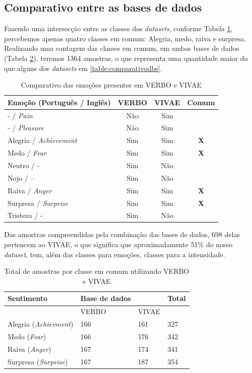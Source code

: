 \subsection{Comparativo entre as bases de dados}

Fazendo uma intersecção entre as classes dos \textit{datasets}, conforme Tabela \ref{table:verbovsvivae}, percebemos apenas quatro classes em comum: Alegria, medo, raiva e surpresa. Realizando uma contagem das classes em comum, em ambas bases de dados (Tabela \ref{table:totalporclasse}), teremos 1364 amostras, o que representa uma quantidade maior do que alguns dos \textit{datasets} em \ref{table:comparativodbs}.

\begin{table}[]
\centering
\caption{Comparativo das emoções presentes em VERBO e VIVAE}
    \begin{tabular}{|l|c|c|c|}
    \hline
        Emoção (Português / Inglês) & VERBO & VIVAE & Comum  \\ \hline
        - / \textit{Pain} & Não & Sim &    \\ \hline
        - / \textit{Pleasure} & Não & Sim &    \\ \hline
        Alegria / \textit{Achievement} & Sim & Sim & \textbf{X}  \\ \hline
        Medo / \textit{Fear} & Sim & Sim & \textbf{X}  \\ \hline
        Neutro / - & Sim & Não &    \\ \hline
        Nojo / – & Sim & Não &    \\ \hline
        Raiva / \textit{Anger} & Sim & Sim & \textbf{X}  \\ \hline
        Surpresa / \textit{Surprise} & Sim & Sim & \textbf{X}  \\ \hline
        Tristeza / - & Sim & Não &    \\ \hline
    \end{tabular}\label{table:verbovsvivae}
\end{table}

Das amostras compreendidas pela combinação das bases de dados, 698 delas pertencem ao \acrshort{VIVAE}, o que significa que aproximadamente 51\% do nosso \textit{dataset}, tem, além das classes para emoções, classes para a intensidade.

\begin{table}[]
    \centering
    \caption{Total de amostras por classe em comum utilizando VERBO e VIVAE}
    \begin{tabular}{|l|l|l|l|}
    \hline
        Sentimento & Base de dados & ~ & Total \\ \hline
        ~ & VERBO & VIVAE & ~ \\ \hline
        Alegria (\textit{Achievment}) & 166 & 161 & 327 \\ \hline
        Medo (\textit{Fear}) & 166 & 176 & 342 \\ \hline
        Raiva (\textit{Anger}) & 167 & 174 & 341 \\ \hline
        Surpresa (\textit{Surprise}) & 167 & 187 & 354 \\ \hline
    \end{tabular}\label{table:totalporclasse}
\end{table}

